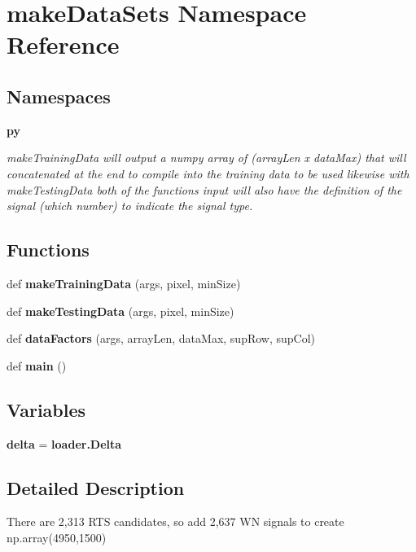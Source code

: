\section{make\+Data\+Sets Namespace Reference}
\label{namespacemake_data_sets}
\subsection*{Namespaces}
\begin{DoxyCompactItemize}
\item 
 \textbf{ py}
\begin{DoxyCompactList}\small\item\em make\+Training\+Data will output a numpy array of (array\+Len x data\+Max) that will concatenated at the end to compile into the training data to be used likewise with make\+Testing\+Data both of the functions input will also have the definition of the signal (which number) to indicate the signal type. \end{DoxyCompactList}\end{DoxyCompactItemize}
\subsection*{Functions}
\begin{DoxyCompactItemize}
\item 
def \textbf{ make\+Training\+Data} (args, pixel, min\+Size)
\item 
def \textbf{ make\+Testing\+Data} (args, pixel, min\+Size)
\item 
def \textbf{ data\+Factors} (args, array\+Len, data\+Max, sup\+Row, sup\+Col)
\item 
def \textbf{ main} ()
\end{DoxyCompactItemize}
\subsection*{Variables}
\begin{DoxyCompactItemize}
\item 
\textbf{ delta} = \textbf{ loader.\+Delta}
\end{DoxyCompactItemize}


\subsection{Detailed Description}
\begin{DoxyVerb}There are 2,313 RTS candidates, so add 2,637 WN signals to create np.array(4950,1500)
\end{DoxyVerb}
 

